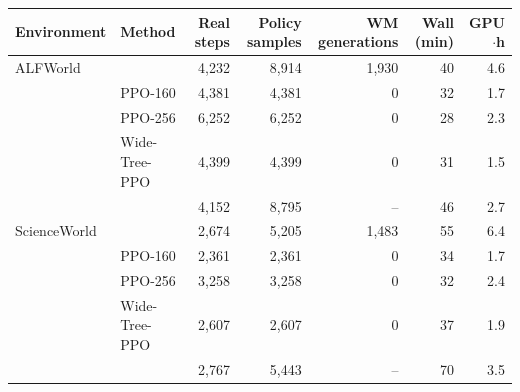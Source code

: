 \begin{tabular}{l l r r r r r}
\toprule
Environment & Method & Real steps & Policy samples & WM generations & Wall (min) & GPU$\cdot$h \\
\midrule
ALFWorld & \wmppo{} & 4,232 & 8,914 & 1,930 & 40 & 4.6 \\
 & PPO-160 & 4,381 & 4,381 & 0 & 32 & 1.7 \\
 & PPO-256 & 6,252 & 6,252 & 0 & 28 & 2.3 \\
 & Wide-Tree-PPO & 4,399 & 4,399 & 0 & 31 & 1.5 \\
 & \qppo{} & 4,152 & 8,795 & -- & 46 & 2.7 \\
\midrule
ScienceWorld & \wmppo{} & 2,674 & 5,205 & 1,483 & 55 & 6.4 \\
 & PPO-160 & 2,361 & 2,361 & 0 & 34 & 1.7 \\
 & PPO-256 & 3,258 & 3,258 & 0 & 32 & 2.4 \\
 & Wide-Tree-PPO & 2,607 & 2,607 & 0 & 37 & 1.9 \\
 & \qppo{} & 2,767 & 5,443 & -- & 70 & 3.5 \\
\bottomrule
\end{tabular}
